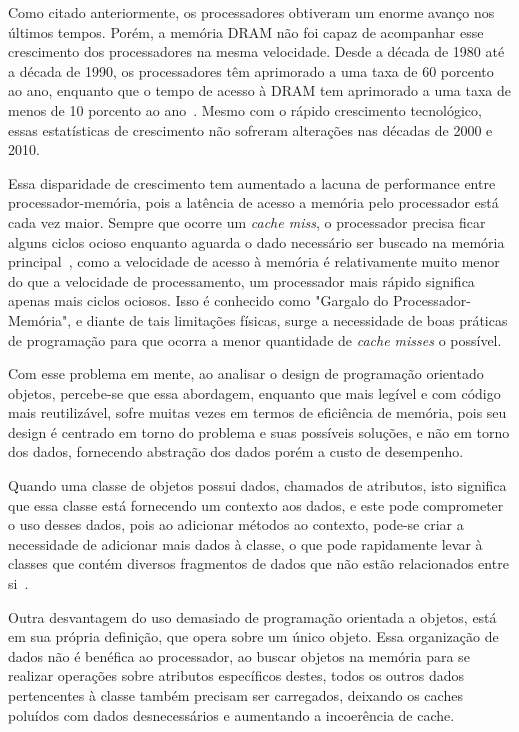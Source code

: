 \documentclass[11pt]{article}
\begin{document}
Como citado anteriormente, os processadores obtiveram um enorme avanço nos últimos tempos. Porém, a memória DRAM não foi 
capaz de acompanhar esse crescimento dos processadores na mesma velocidade. Desde a década de 1980 até a década de 1990, os 
processadores têm aprimorado a uma taxa de 60 porcento ao ano, enquanto que o tempo de acesso à DRAM tem aprimorado a uma 
taxa de menos de 10 porcento ao ano~\cite{Patterson:1997:CIR:623274.624083}. Mesmo com o rápido crescimento tecnológico, essas 
estatísticas de crescimento não sofreram alterações nas décadas de 2000 e 2010.

Essa disparidade de crescimento tem aumentado a lacuna de performance entre processador-memória, pois 
a latência de acesso a memória pelo processador está cada vez maior. Sempre que ocorre um \textit{cache miss}, o processador 
precisa ficar alguns ciclos ocioso enquanto aguarda o dado necessário ser buscado na memória 
principal~\cite{Mahapatra:1999:PBP:357783.331677}, como a velocidade de 
acesso à memória é relativamente muito menor do que a velocidade de processamento, um processador mais rápido significa apenas 
mais ciclos ociosos. Isso é conhecido como "Gargalo do Processador-Memória", e diante de tais limitações físicas, surge a 
necessidade de boas práticas de programação para que ocorra a menor quantidade de \textit{cache misses} o possível.

Com esse problema em mente, ao analisar o design de programação orientado objetos, percebe-se que essa abordagem, enquanto que 
mais legível e com código mais reutilizável, sofre muitas vezes em termos de eficiência de memória, pois seu design é centrado 
em torno do problema e suas possíveis soluções, e não em torno dos dados, fornecendo abstração dos dados porém a 
custo de desempenho.

Quando uma classe de objetos possui dados, chamados de atributos, isto significa que essa classe está fornecendo um contexto 
aos dados, e este pode comprometer o uso desses dados, pois ao adicionar métodos ao contexto, pode-se criar a necessidade 
de adicionar mais dados à classe, o que pode rapidamente levar à classes que contém diversos fragmentos de dados que não 
estão relacionados entre si~\cite{fabiandod}.

Outra desvantagem do uso demasiado de programação orientada a objetos, está em sua própria definição, que opera sobre um único 
objeto. Essa organização de dados não é benéfica ao processador, ao buscar objetos na memória para se realizar operações sobre 
atributos específicos destes, todos os outros dados pertencentes à classe também precisam ser carregados, deixando os caches 
poluídos com dados desnecessários e aumentando a incoerência de cache.
\end{document}

